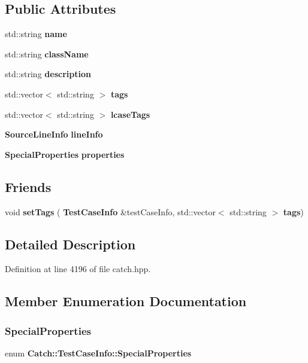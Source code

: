 \subsection*{Public Attributes}
\begin{DoxyCompactItemize}
\item 
std\+::string \textbf{ name}
\item 
std\+::string \textbf{ class\+Name}
\item 
std\+::string \textbf{ description}
\item 
std\+::vector$<$ std\+::string $>$ \textbf{ tags}
\item 
std\+::vector$<$ std\+::string $>$ \textbf{ lcase\+Tags}
\item 
\textbf{ Source\+Line\+Info} \textbf{ line\+Info}
\item 
\textbf{ Special\+Properties} \textbf{ properties}
\end{DoxyCompactItemize}
\subsection*{Friends}
\begin{DoxyCompactItemize}
\item 
void \textbf{ set\+Tags} (\textbf{ Test\+Case\+Info} \&test\+Case\+Info, std\+::vector$<$ std\+::string $>$ \textbf{ tags})
\end{DoxyCompactItemize}


\subsection{Detailed Description}


Definition at line 4196 of file catch.\+hpp.



\subsection{Member Enumeration Documentation}
\mbox{\label{struct_catch_1_1_test_case_info_a39b232f74b4a7a6f2183b96759027eac}} 
\subsubsection{SpecialProperties}
{\footnotesize\ttfamily enum \textbf{ Catch\+::\+Test\+Case\+Info\+::\+Special\+Properties}}

